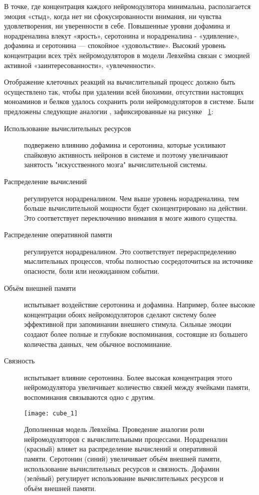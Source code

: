 В точке, где концентрация каждого нейромодулятора минимальна, располагается эмоция «стыд», когда нет ни сфокусированности внимания, ни чувства удовлетворения, ни уверенности в себе. Повышенные уровни дофамина и норадреналина влекут «ярость», серотонина и норадреналина - «удивление», дофамина и серотонина — спокойное «удовольствие». Высокий уровень концентрации всех трёх нейромодуляторов в модели Левхейма связан с эмоцией активной «заинтересованности», «увлеченности».


Отображение клеточных реакций на вычислительный процесс должно быть осуществлено так, чтобы при удалении всей биохимии, отсутствии настоящих моноаминов и белков удалось сохранить роли нейромодуляторов в системе. Были предложены следующие аналогии \cite{talanov2014}, зафиксированные на рисунке ~\ref{fig:cube_1}:
\begin{description}
\item[Использование вычислительных ресурсов] подвержено влиянию дофамина и серотонина, которые усиливают спайковую активность нейронов в системе и поэтому увеличивают занятость "искусственного мозга" вычислительной системы.
\item[Распределение вычислений] регулируется норадреналином. Чем выше уровень норадреналина, тем больше вычислительной мощности будет сконцентрировано на действии. Это соответствует переключению внимания в мозге живого существа.
\item[Распределение оперативной памяти] регулируется норадреналином. Это соответствует перераспределению мыслительных процессов, чтобы полностью сосредоточиться на источнике опасности, боли или неожиданном событии. 
\item[Объём внешней памяти] испытывает воздействие серотонина и дофамина. Например, более высокие концентрации обоих нейромодуляторов сделают систему более эффективной при запоминании внешнего стимула. Сильные эмоции создают более полные и глубокие воспоминания, состоящие из большего количества данных, чем обычное воспоминание.
\item[Связность] испытывает влияние серотонина. Более высокая концентрация этого нейромодулятора увеличивает количество связей между ячейками памяти, воспоминания связываются одно с другим.
\end{description}



\begin{figure}
	\centering
	\texttt{[image: cube\_1]}
	\caption{Дополненная модель Левхейма. Проведение аналогии роли нейромодуляторов с вычислительными процессами. Норадреналин (красный) влияет на распределение вычислений и оперативной памяти. Серотонин (синий) увеличивает объём внешней памяти, использование вычислительных ресурсов и связность. Дофамин (зелёный) регулирует использование вычислительных ресурсов и объём внешней памяти.}
	\label{fig:cube_1}
\end{figure}
